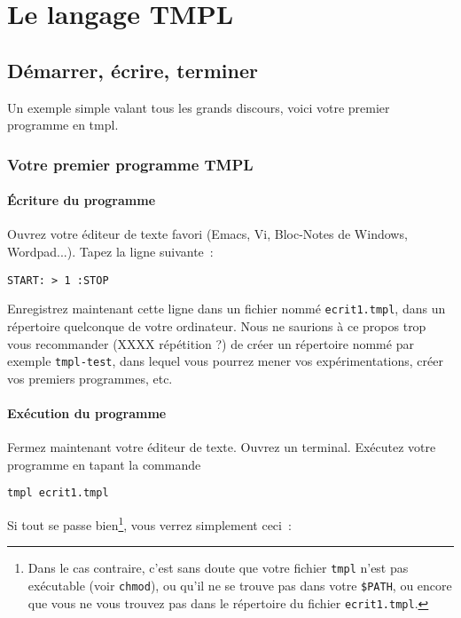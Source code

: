 \documentclass[a4paper, 11pt]{report}
\begin{document}
\part{Le langage TMPL}


\chapter{Démarrer, écrire, terminer}

Un exemple simple valant tous les grands discours, voici votre premier
programme en tmpl. 

\par


\section{Votre premier programme TMPL}


\subsection{Écriture du programme}

Ouvrez votre éditeur de texte favori (Emacs, Vi, Bloc-Notes de Windows,
Wordpad...). Tapez la ligne suivante~:

\begin{verbatim}
START: > 1 :STOP
\end{verbatim}

Enregistrez maintenant cette ligne dans un fichier nommé
\texttt{ecrit1.tmpl}, dans un répertoire quelconque de votre
ordinateur. Nous ne saurions à ce propos trop vous recommander (XXXX
répétition ?) de créer un répertoire nommé par exemple
\texttt{tmpl-test}, dans lequel vous pourrez mener vos expérimentations,
créer vos premiers programmes, etc.

\par



\subsection{Exécution du programme}

Fermez maintenant votre éditeur de texte. Ouvrez un terminal. Exécutez
votre programme en tapant la commande

\begin{verbatim}
tmpl ecrit1.tmpl
\end{verbatim}

Si tout se passe bien\footnote{Dans le cas contraire, c'est sans doute
  que votre fichier \texttt{tmpl} n'est pas exécutable (voir
  \texttt{chmod}), ou qu'il ne se trouve pas dans votre \texttt{\$PATH},
  ou encore que vous ne vous trouvez pas dans le répertoire du fichier
  \texttt{ecrit1.tmpl}.  }, vous verrez simplement ceci~:
\end{document}
